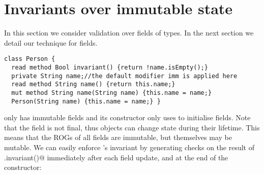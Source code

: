 
%

\section{Invariants over immutable state}
\label{s:immState}
In this section we consider validation over fields of \Q@imm@ types.
In the next section we detail our technique for \Q@capsule@ fields.

\begin{lstlisting}
class Person {
  read method Bool invariant() {return !name.isEmpty();}
  private String name;//the default modifier imm is applied here
  read method String name() {return this.name;}
  mut method String name(String name) {this.name = name;}
  Person(String name) {this.name = name;} }
\end{lstlisting}
\Q@Person@ only has immutable fields and its constructor only uses \Q@this@ to initialise fields.
Note that the \Q@name@ field is not final, thus \Q@Person@ objects can change state during their lifetime. This means that the ROGs of all \Q@Person@s fields are immutable, but \Q@Person@s themselves may be mutable.
We can easily enforce \Q@Person@'s invariant by generating checks on the result of \Q@this.invariant()@ immediately after each field update, and at the end of the constructor:%

